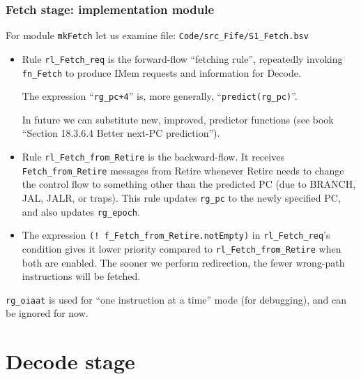 \begin{frame}[fragile]
\frametitle{Fetch stage: implementation module}

\footnotesize

For module {\tt mkFetch} let us examine file: \verb|Code/src_Fife/S1_Fetch.bsv|

\vspace{4ex}

\begin{itemize}

 \item Rule \verb|rl_Fetch_req| is the forward-flow ``fetching rule'',
       repeatedly invoking \verb|fn_Fetch| to produce IMem requests
       and information for Decode.

       The expression ``\verb|rg_pc+4|'' is, more generally,
       ``\verb|predict(rg_pc)|''.

       In future we can substitute new, improved, predictor functions
       (see book ``Section 18.3.6.4 Better next-PC prediction'').

 \item Rule \verb|rl_Fetch_from_Retire| is the backward-flow.  It
       receives \verb|Fetch_from_Retire| messages from Retire whenever
       Retire needs to change the control flow to something other than
       the predicted PC (due to BRANCH, JAL, JALR, or traps).  This
       rule updates \verb|rg_pc| to the newly specified PC, and also
       updates \verb|rg_epoch|.

 \vspace{4ex}

 \item The expression \verb|(! f_Fetch_from_Retire.notEmpty)|
       in \verb|rl_Fetch_req|'s condition gives it lower priority
       compared to \verb|rl_Fetch_from_Retire| when both are enabled.
       The sooner we perform redirection, the fewer wrong-path
       instructions will be fetched.

\end{itemize}

\vspace{4ex}

{\tt rg\_oiaat} is used for ``one instruction at a time'' mode (for
debugging), and can be ignored for now.

\end{frame}


\section{Decode stage}

